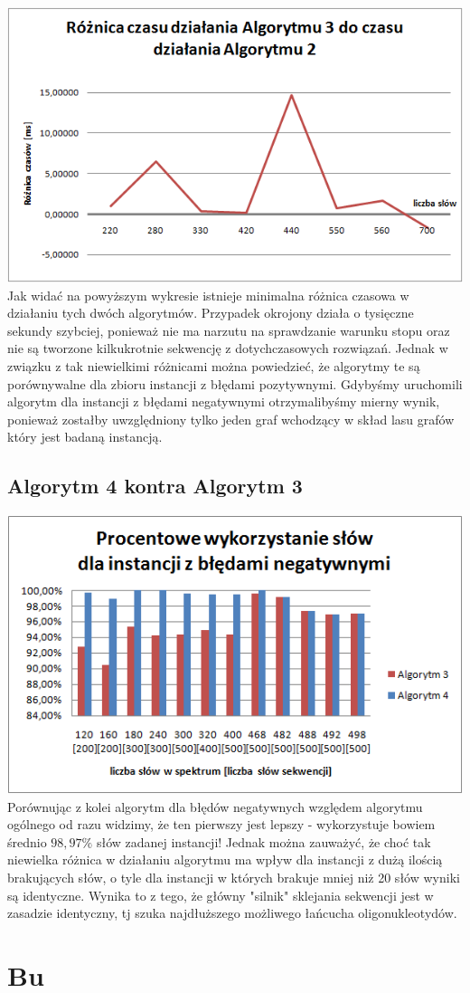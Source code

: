 \documentclass[a4paper]{article}
\begin{document}
\includegraphics{timeDiff_general_vs_positive.png}
Jak widać na powyższym wykresie istnieje minimalna różnica czasowa w działaniu tych dwóch algorytmów. Przypadek okrojony działa o tysięczne sekundy szybciej, ponieważ nie ma narzutu na sprawdzanie warunku stopu oraz nie są tworzone kilkukrotnie sekwencję z dotychczasowych rozwiązań. Jednak w związku z tak niewielkimi różnicami można powiedzieć, że algorytmy te są porównywalne dla zbioru instancji z błędami pozytywnymi.
Gdybyśmy uruchomili algorytm dla instancji z błędami negatywnymi otrzymalibyśmy mierny wynik, ponieważ zostałby uwzględniony tylko jeden graf wchodzący w skład lasu grafów który jest badaną instancją.

\subsection{Algorytm 4 kontra Algorytm 3}

\includegraphics{percentageUsedWords_general_vs_negative.png}
Porównując z kolei algorytm dla błędów negatywnych względem algorytmu ogólnego od razu widzimy, że ten pierwszy jest lepszy - wykorzystuje bowiem średnio $98,97\%$ słów zadanej instancji! Jednak można zauważyć, że choć tak niewielka różnica w działaniu algorytmu ma wpływ dla instancji z dużą ilością brakujących słów, o tyle dla instancji w których brakuje mniej niż 20 słów wyniki są identyczne. Wynika to z tego, że główny "silnik" sklejania sekwencji jest w zasadzie identyczny, tj szuka najdłuższego możliwego łańcucha oligonukleotydów.

\section{Bu}
\end{document}
